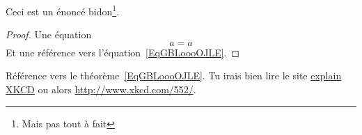 \documentclass[a4paper,11pt]{book}
\begin{document}
\begin{theorem}
    Ceci est un énoncé bidon\footnote{Mais pas tout à fait}.
\end{theorem}

\begin{proof}
    Une équation
    \begin{equation}    \label{EqGBLoooOJLE}
        a=a
    \end{equation}
    Et une référence vers l'équation~\eqref{EqGBLoooOJLE}.
\end{proof}

Référence vers le théorème~\ref{EqGBLoooOJLE}. Tu irais bien lire le site \href{http://www.explainxkcd.com/wiki/index.php/Main_Page }{explain XKCD} ou alors \url{http://www.xkcd.com/552/}.


\end{document}
